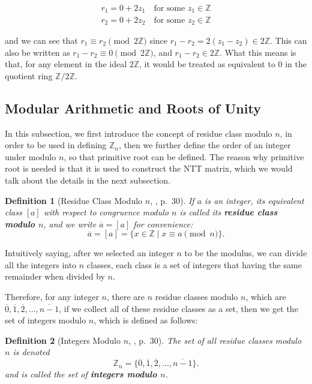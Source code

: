 \documentclass[12pt]{article}
\newtheorem{definition}{Definition}[section]
\begin{document}
\begin{align*}
    r_1 = 0 + 2 z_1 \quad \text{for some } z_1 \in \mathbb{Z} \\
    r_2 = 0 + 2 z_2 \quad \text{for some } z_2 \in \mathbb{Z}
\end{align*}

and we can see that $r_1 \equiv r_2 \pmod{2\mathbb{Z}}$ since $r_1 - r_2 = 2(z_1 - z_2) \in 2\mathbb{Z}$.
This can also be written as $r_1 - r_2 \equiv 0 \pmod{2\mathbb{Z}}$, and $r_1 - r_2 \in 2\mathbb{Z}$. 
What this means is that, for any element in the ideal $2\mathbb{Z}$, 
it would be treated as equivalent to $0$ in the quotient ring $\mathbb{Z}/2\mathbb{Z}$.

\subsection{Modular Arithmetic and Roots of Unity}

In this subsection, we first introduce the concept of residue class modulo $n$, 
in order to be used in defining $\mathbb{Z}_n$, 
then we further define the order of an integer under modulo $n$, 
so that primitive root can be defined. 
The reason why primitive root is needed is that it is used to construct the NTT matrix, 
which we would talk about the details in the next subsection.

\begin{definition}[Residue Class Modulo $n$, \cite{algebra}, p.~30]
    If $a$ is an integer, its equivalent class $[a]$ with respect to congruence modulo $n$ is called its \textbf{residue class modulo $n$}, 
    and we write $\overline{a} = [a]$ for convenience: 
    \begin{equation*}
    \overline{a} = [a] = \{x \in \mathbb{Z} \mid x \equiv a \pmod{n}\}.
    \end{equation*}
\end{definition}

Intuitively saying, after we selected an integer $n$ to be the modulus, 
we can divide all the integers into $n$ classes, 
each class is a set of integers that having the same remainder when divided by $n$.

Therefore, for any integer $n$, there are $n$ residue classes modulo $n$, 
which are $\overline{0}, \overline{1}, \overline{2}, \ldots, \overline{n - 1}$, 
if we collect all of these residue classes as a set, 
then we get the set of integers modulo $n$, 
which is defined as follows:

\begin{definition}[Integers Modulo $n$, \cite{algebra}, p.~30]
    The set of all residue classes modulo $n$ is denoted 
    \begin{equation*}
    \mathbb{Z}_n = \{\overline{0}, \overline{1}, \overline{2}, \ldots, \overline{n - 1}\}.
    \end{equation*}
    and is called the set of \textbf{integers modulo $n$}.
\end{definition}
\end{document}

